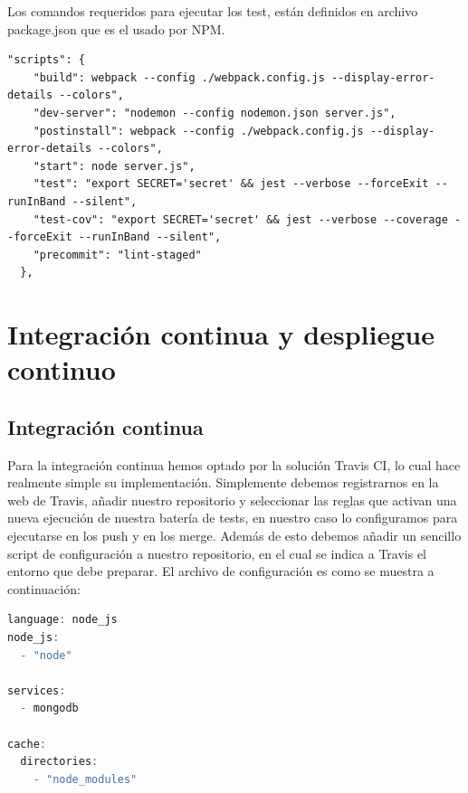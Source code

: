 Los comandos requeridos para ejecutar los test, están definidos en archivo package.json que es el usado por NPM.
\begin{lstlisting}
"scripts": {
    "build": webpack --config ./webpack.config.js --display-error-details --colors",
    "dev-server": "nodemon --config nodemon.json server.js",
    "postinstall": webpack --config ./webpack.config.js --display-error-details --colors",
    "start": node server.js",
    "test": "export SECRET='secret' && jest --verbose --forceExit --runInBand --silent",
    "test-cov": "export SECRET='secret' && jest --verbose --coverage --forceExit --runInBand --silent",
    "precommit": "lint-staged"
  },
\end{lstlisting}

\section {Integración continua y despliegue continuo}
\subsection{Integración continua}
Para la integración continua hemos optado por la solución Travis CI, lo cual hace realmente simple su implementación. Simplemente debemos registrarnos en la web de Travis, añadir nuestro repositorio y seleccionar las reglas que activan una nueva ejecución de nuestra batería de tests, en nuestro caso lo configuramos para ejecutarse en los push y en los merge. Además de esto debemos añadir un sencillo script de configuración a nuestro repositorio, en el cual se indica a Travis el entorno que debe preparar. El archivo de configuración es como se muestra a continuación:
\begin{lstlisting}[language=javascript,caption={Test Unitarios},label={lst:appjs}]
language: node_js
node_js:
  - "node"

services:
  - mongodb

cache:
  directories:
    - "node_modules"

\end{lstlisting}
